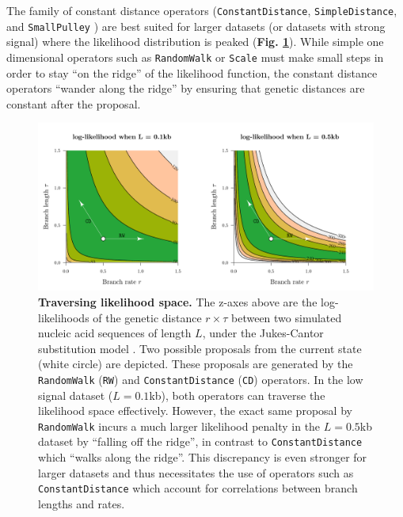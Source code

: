 \documentclass[10pt,letterpaper]{article}
\begin{document}
The family of constant distance operators (\texttt{ConstantDistance}, \texttt{SimpleDistance}, and \texttt{SmallPulley} \cite{zhang2020improving}) are best suited for larger datasets (or datasets with strong signal) where the likelihood distribution is peaked (\textbf{Fig. \ref{fig:rateparams}}).
While simple one dimensional operators such as \texttt{RandomWalk} or \texttt{Scale} must make small steps in order to stay ``on the ridge'' of the likelihood function, the constant distance operators ``wander along the ridge''  by ensuring that genetic distances are constant after the proposal.



\begin{figure}[!h]
\includegraphics[width=\textwidth]{Figures/correlations.pdf}
\caption{\textbf{Traversing likelihood space.}
The z-axes above are the log-likelihoods of the genetic distance $r \times \tau$ between two simulated nucleic acid sequences of length $L$, under the Jukes-Cantor substitution model \cite{jukes1969evolution}. 
Two possible proposals from the current state (white circle) are depicted.
These proposals are generated by the \texttt{RandomWalk} (\texttt{RW}) and \texttt{ConstantDistance} (\texttt{CD}) operators.
In the low signal dataset ($L=0.1$kb), both operators can traverse the likelihood space effectively.
 However, the exact same proposal by \texttt{RandomWalk} incurs a much larger likelihood penalty in the $L=0.5$kb dataset by ``falling off the ridge'', in contrast to \texttt{ConstantDistance} which ``walks along the ridge''.
 This discrepancy is even stronger for larger datasets and thus necessitates the use of operators such as \texttt{ConstantDistance} which account for correlations between branch lengths and rates. }
\label{fig:rateparams}
\end{figure}
\end{document}
